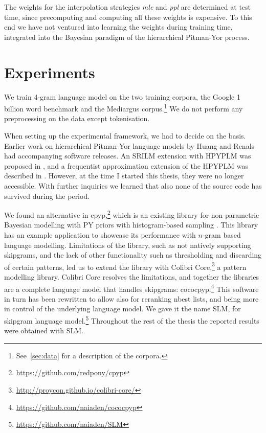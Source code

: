 The weights for the interpolation strategies \textsl{mle} and \textsl{ppl} are determined at test time, since precomputing and computing all these weights is expensive. To this end we have not ventured into learning the weights during training time, integrated into the Bayesian paradigm of the hierarchical Pitman-Yor process.

\section{Experiments}
We train 4-gram language model on the two training corpora, the Google 1 billion word benchmark and the Mediargus corpus.\footnote{See~\ref{sec:data} for a description of the corpora.} We do not perform any preprocessing on the data except tokenisation. 

When setting up the experimental framework, we had to decide on the basis. Earlier work on hierarchical Pitman-Yor language models by Huang and Renals had accompanying software releases. An SRILM extension with HPYPLM was proposed in \cite{huang2007hierarchical}, and a frequentist approximation extension of the HPYPLM was described in \cite{huang2010power}. However, at the time I started this thesis, they were no longer accessible. With further inquiries we learned that also none of the source code has survived during the period. 

We found an alternative in cpyp,\footnote{\url{https://github.com/redpony/cpyp}} which is an existing library for non-parametric Bayesian modelling with PY priors with histogram-based sampling \cite{blunsom2009note}. This library has an example application to showcase its performance with $n$-gram based language modelling. Limitations of the library, such as not natively supporting skipgrams, and the lack of other functionality such as thresholding and discarding of certain patterns, led us to extend the library with Colibri Core,\footnote{\url{http://proycon.github.io/colibri-core/}} a pattern modelling library. Colibri Core resolves the limitations, and together the libraries are a complete language model that handles skipgrams: cococpyp.\footnote{\url{https://github.com/naiaden/cococpyp}} This software in turn has been rewritten to allow also for reranking nbest lists, and being more in control of the underlying language model. We gave it the name SLM, for skipgram language model.\footnote{\url{https://github.com/naiaden/SLM}} Throughout the rest of the thesis the reported results were obtained with SLM.

